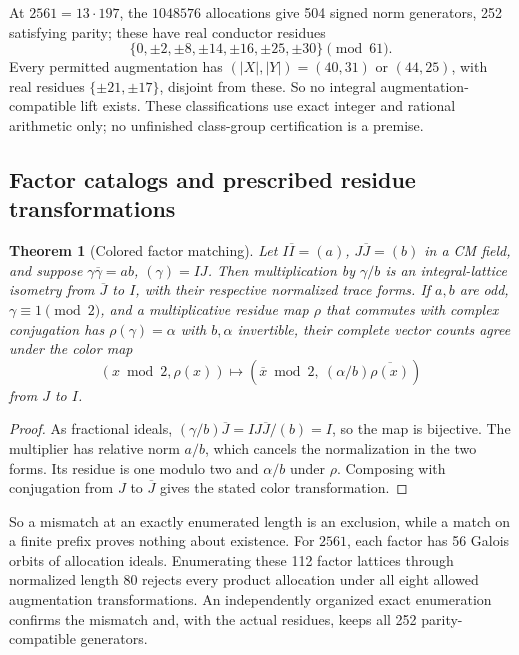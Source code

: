 \documentclass[11pt]{article}
\newtheorem{theorem}{Theorem}[section]
\theoremstyle{definition}
\theoremstyle{remark}
\begin{document}
At $2561=13\cdot197$, the $1048576$ allocations give 504 signed norm
generators, 252 satisfying parity; these have real conductor residues
\[
 \{0,\pm2,\pm8,\pm14,\pm16,\pm25,\pm30\}\pmod{61}.
\]
Every permitted augmentation has $(|X|,|Y|)=(40,31)$ or $(44,25)$, with
real residues $\{\pm21,\pm17\}$, disjoint from these. So no integral
augmentation-compatible lift exists. These classifications use exact
integer and rational arithmetic only; no unfinished class-group
certification is a premise.

\subsection{Factor catalogs and prescribed residue transformations}
\begin{theorem}[Colored factor matching]\label{thm:factor}
Let $I\overline I=(a)$, $J\overline J=(b)$ in a CM field, and suppose
$\gamma\overline\gamma=ab$, $(\gamma)=IJ$. Then multiplication by
$\gamma/b$ is an integral-lattice isometry from $\overline J$ to $I$,
with their respective normalized trace forms. If $a,b$ are odd,
$\gamma\equiv1\pmod2$, and a multiplicative residue map $\rho$ that
commutes with complex conjugation has $\rho(\gamma)=\alpha$ with
$b,\alpha$ invertible, their complete vector
counts agree under the color map
\[
 (x\bmod2,\rho(x))\longmapsto
 (\overline x\bmod2,\ (\alpha/b)\overline{\rho(x)})
\]
from $J$ to $I$.
\end{theorem}
\begin{proof}
As fractional ideals, $(\gamma/b)\overline J=IJ\overline J/(b)=I$, so the
map is bijective. The multiplier has relative norm $a/b$, which cancels the
normalization in the two forms. Its residue is one modulo two and
$\alpha/b$ under $\rho$. Composing with conjugation from $J$ to
$\overline J$ gives the stated color transformation.
\end{proof}
So a mismatch at an exactly enumerated length is an exclusion, while a
match on a finite prefix proves nothing about existence. For $2561$, each
factor has 56 Galois orbits of allocation ideals. Enumerating these 112
factor lattices through normalized length 80 rejects every product
allocation under all eight allowed augmentation transformations. An
independently organized exact enumeration confirms the mismatch and, with
the actual residues, keeps all 252 parity-compatible generators.
\end{document}
